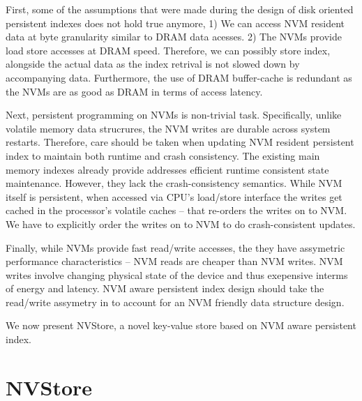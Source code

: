 First, some of the assumptions that were made during the design of disk oriented persistent
indexes does not hold true anymore, 1) We can access NVM resident data at byte granularity similar to
DRAM data acesses. 2) The NVMs provide load store accesses at DRAM speed. Therefore, we can
possibly store index, alongside the actual data as the index retrival is not slowed down by
accompanying data. Furthermore, the use of DRAM buffer-cache is redundant as the NVMs are 
as good as DRAM in terms of access latency.

Next, persistent programming on NVMs is non-trivial task. Specifically, unlike volatile memory
data strucrures, the NVM writes are durable across system restarts. Therefore, care should be
taken when updating NVM resident persistent index to maintain both runtime and crash consistency.
The existing main memory indexes already provide addresses efficient runtime consistent state 
maintenance. However, they lack the crash-consistency semantics. While NVM itself is persistent,
when accessed via CPU's load/store interface the writes get cached in the processor's volatile
caches -- that re-orders the writes on to NVM. We have to explicitly order the writes on to NVM
to do crash-consistent updates.


Finally, while NVMs provide fast read/write accesses, the they have assymetric performance 
characteristics -- NVM reads are cheaper than NVM writes. NVM writes involve changing physical
state of the device and thus exepensive interms of energy and latency. NVM aware persistent 
index design should take the read/write assymetry in to account for an NVM friendly data
structure design.

We now present NVStore, a novel key-value store based on NVM aware persistent index.


\section{NVStore}


